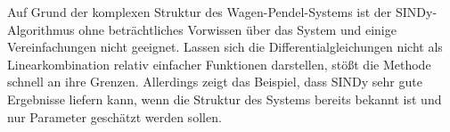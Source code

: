 Auf Grund der komplexen Struktur des Wagen-Pendel-Systems ist der SINDy-Algorithmus ohne beträchtliches Vorwissen über das System und einige Vereinfachungen nicht geeignet. Lassen sich die Differentialgleichungen nicht als Linearkombination relativ einfacher Funktionen darstellen, stößt die Methode schnell an ihre Grenzen. Allerdings zeigt das Beispiel, dass SINDy sehr gute Ergebnisse liefern kann, wenn die Struktur des Systems bereits bekannt ist und nur Parameter geschätzt werden sollen. 







